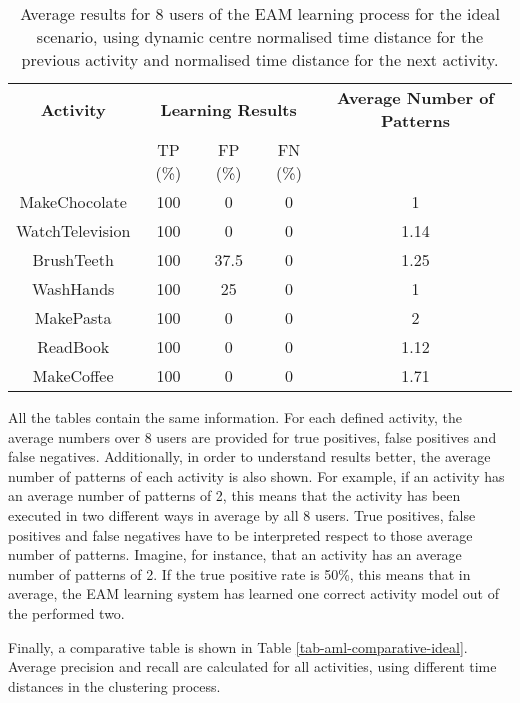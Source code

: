 \begin{table}[htbp]\scriptsize
  \begin{center}
        \begin{tabular}{ccccc}
            \hline            
            \textbf{Activity} & \multicolumn{3}{c}{\textbf{Learning Results}} & \textbf{Average Number of Patterns} \\
             & TP (\%) & FP (\%) & FN (\%) & \\             
            \hline
            MakeChocolate   & 100 & 0     & 0  & 1 \\
	    WatchTelevision & 100 & 0     & 0  & 1.14    \\
	    BrushTeeth      & 100 & 37.5  & 0  & 1.25 \\
	    WashHands       & 100 & 25    & 0  & 1 \\
	    MakePasta       & 100 & 0     & 0  & 2 \\
	    ReadBook        & 100 & 0     & 0  & 1.12  \\
	    MakeCoffee      & 100 & 0     & 0  & 1.71  \\
            \hline
        \end{tabular}
        \caption{Average results for 8 users of the EAM learning process for the ideal scenario, using dynamic centre normalised time distance for the previous activity and normalised time distance for the next activity.}
        \label{tab-rp-ideal-t2}
    \end{center}
\end{table}

All the tables contain the same information. For each defined activity, the average numbers over 8 users are provided for true positives, false positives and false negatives. Additionally, in order to understand results better, the average number of patterns of each activity is also shown. For example, if an activity has an average number of patterns of 2, this means that the activity has been executed in two different ways in average by all 8 users. True positives, false positives and false negatives have to be interpreted respect to those average number of patterns. Imagine, for instance, that an activity has an average number of patterns of 2. If the true positive rate is 50\%, this means that in average, the EAM learning system has learned one correct activity model out of the performed two. 

Finally, a comparative table is shown in Table \ref{tab-aml-comparative-ideal}. Average precision and recall are calculated for all activities, using different time distances in the clustering process.

